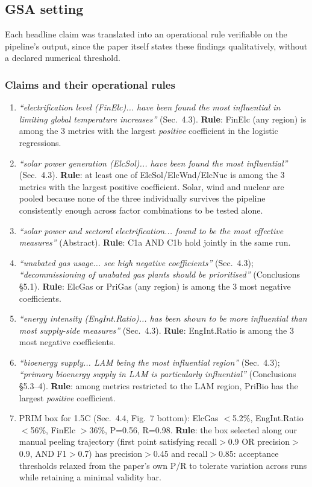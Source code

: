 \documentclass[sn-basic]{sn-jnl}%
\begin{document}
\subsection{GSA setting}

 Each headline claim was translated into an operational rule verifiable on the pipeline's output, since the paper itself states these findings qualitatively, without a declared numerical threshold.

\subsubsection{Claims and their operational rules}

\begin{enumerate}
\item[C1a] \textit{``electrification level (FinElc)... have been found the most influential in limiting global temperature increases''} (Sec.~4.3). \textbf{Rule}: FinElc (any region) is among the 3 metrics with the largest \emph{positive} coefficient in the logistic regressions.
\item[C1b] \textit{``solar power generation (ElcSol)... have been found the most influential''} (Sec.~4.3). \textbf{Rule}: at least one of ElcSol/ElcWnd/ElcNuc is among the 3 metrics with the largest positive coefficient. Solar, wind and nuclear are pooled because none of the three individually survives the pipeline consistently enough across factor combinations to be tested alone.
	\item[C1] \textit{``solar power and sectoral electrification... found to be the most effective measures''} (Abstract). \textbf{Rule}: C1a AND C1b hold
	jointly in the same run.
	\item[C2] \textit{``unabated gas usage... see high negative coefficients''} (Sec.~4.3); \textit{``decommissioning of unabated gas plants should be prioritised''} (Conclusions \S5.1). \textbf{Rule}: ElcGas or PriGas (any region) is among the 3 most negative coefficients.
	\item[C3] \textit{``energy intensity (EngInt.Ratio)... has been shown to be more influential than most supply-side measures''} (Sec.~4.3). \textbf{Rule}: EngInt.Ratio is among the 3 most negative coefficients.
\item[C4] \textit{``bioenergy supply... LAM being the most influential region''} (Sec.~4.3); \textit{``primary bioenergy supply in LAM is particularly influential''} (Conclusions \S5.3--4). \textbf{Rule}: among metrics restricted to the LAM region, PriBio has the largest \emph{positive} coefficient.
	\item[C5] PRIM box for 1.5\textdegree C (Sec.~4.4, Fig.~7 bottom): ElcGas $<$5.2\%, EngInt.Ratio $<$56\%, FinElc $>$36\%, P=0.56, R=0.98. \textbf{Rule}: the box selected along our manual peeling trajectory (first point satisfying recall$>$0.9 OR precision$>$0.9, AND F1$>$0.7) has precision$>$0.45 and recall$>$0.85: acceptance thresholds relaxed from the paper's own P/R to tolerate variation across runs while retaining a minimal validity bar.
\end{enumerate}
\end{document}
